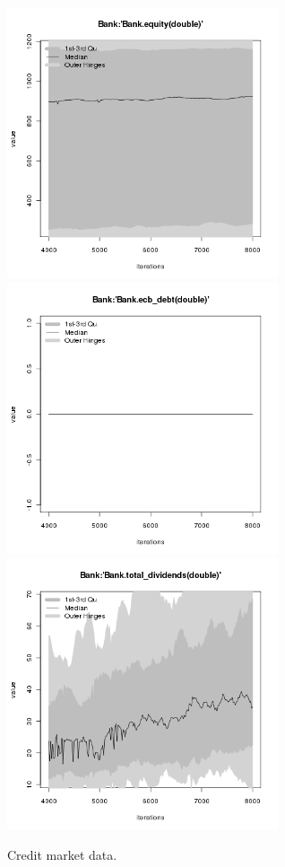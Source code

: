 \begin{figure}[H!]
\begin{minipage}{17cm}
\includegraphics[width=8cm]{./png/tax_0.05/Bank-equity.png}\\
\includegraphics[width=8cm]{./png/tax_0.05/Bank-ecb_debt.png}
\includegraphics[width=8cm]{./png/tax_0.05/Bank-total_dividends.png}
\end{minipage}
\caption{Credit market data.}
\label{Figure: Credit Market}
\end{figure}

%
